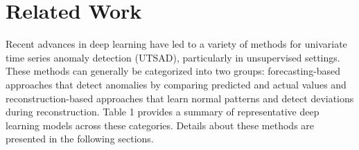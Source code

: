\section{Related Work}
\label{sec:relatedwork}
Recent advances in deep learning have led to a variety of methods for univariate time series anomaly detection (UTSAD),
particularly in unsupervised settings. These methods can generally be categorized into two groups: \one
forecasting-based approaches that detect anomalies by comparing predicted and actual values and \two reconstruction-based
approaches that learn normal patterns and detect deviations during reconstruction. Table 1 provides a summary of representative deep
learning models across these categories. Details about these methods are presented in the
following sections. 
\begin{table}[h!]
\centering
\caption{Summary of unsupervised deep learning methods for UTSAD. (AE: Autoencoders, VAE: Variational Autoencoders, GAN: Generative Adversarial Network)}
\renewcommand{\arraystretch}{1.5}
\setlength{\tabcolsep}{2pt} 
\end{table}
